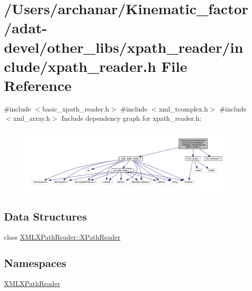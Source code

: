 \hypertarget{adat-devel_2other__libs_2xpath__reader_2include_2xpath__reader_8h}{}\section{/\+Users/archanar/\+Kinematic\+\_\+factor/adat-\/devel/other\+\_\+libs/xpath\+\_\+reader/include/xpath\+\_\+reader.h File Reference}
\label{adat-devel_2other__libs_2xpath__reader_2include_2xpath__reader_8h}
{\ttfamily \#include $<$basic\+\_\+xpath\+\_\+reader.\+h$>$}\newline
{\ttfamily \#include $<$xml\+\_\+tcomplex.\+h$>$}\newline
{\ttfamily \#include $<$xml\+\_\+array.\+h$>$}\newline
Include dependency graph for xpath\+\_\+reader.\+h\+:
\nopagebreak
\begin{figure}[H]
\begin{center}
\leavevmode
\includegraphics[width=350pt]{d6/db2/adat-devel_2other__libs_2xpath__reader_2include_2xpath__reader_8h__incl}
\end{center}
\end{figure}
\subsection*{Data Structures}
\begin{DoxyCompactItemize}
\item 
class \mbox{\hyperlink{classXMLXPathReader_1_1XPathReader}{X\+M\+L\+X\+Path\+Reader\+::\+X\+Path\+Reader}}
\end{DoxyCompactItemize}
\subsection*{Namespaces}
\begin{DoxyCompactItemize}
\item 
 \mbox{\hyperlink{namespaceXMLXPathReader}{X\+M\+L\+X\+Path\+Reader}}
\end{DoxyCompactItemize}
